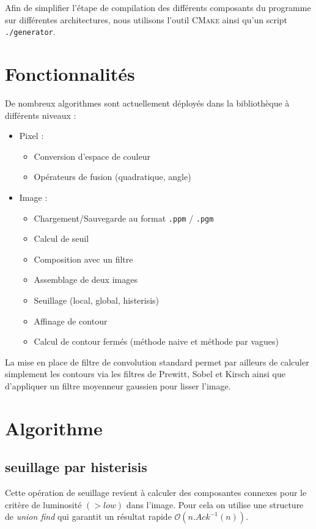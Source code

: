 Afin de simplifier l'étape de compilation des différents composants du programme sur différentes architectures, nous utilisons l'outil \textsc{CMake} ainsi qu'un script \texttt{./generator}.


\section{Fonctionnalités}

De nombreux algorithmes sont actuellement déployés dans la bibliothèque à différents niveaux :

\begin{itemize}
	\item Pixel :
		\begin{itemize}
			\item Conversion d'espace de couleur
			\item Opérateurs de fusion (quadratique, angle)
		\end{itemize}
	\item Image :
		\begin{itemize}
			\item Chargement/Sauvegarde au format \texttt{.ppm} / \texttt{.pgm}
			\item Calcul de seuil
			\item Composition avec un filtre
			\item Assemblage de deux images
			\item Seuillage (local, global, histerisis)
			\item Affinage de contour
			\item Calcul de contour fermés (méthode naive et méthode par vagues)
		\end{itemize}
\end{itemize}

La mise en place de filtre de convolution standard permet par ailleurs de calculer simplement les contours via les filtres de Prewitt, Sobel et Kirsch ainsi que d'appliquer un filtre moyenneur gaussien pour lisser l'image.



\section{Algorithme}
\subsection{seuillage par histerisis}
Cette opération de seuillage revient à calculer des composantes connexes pour le critère de luminosité $(>low)$ dans l'image. Pour cela on utilise une structure de \emph{union find} qui garantit un résultat rapide $\mathcal O(n.Ack^{-1}(n))$.

